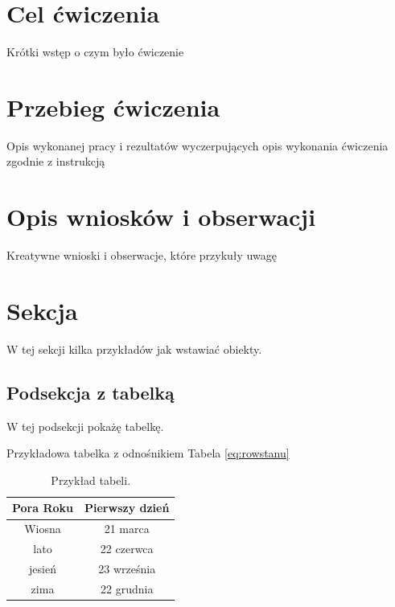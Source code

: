 \documentclass{sprawozdanie-agh}
\begin{document}

\stronatytulowa{}


\section{Cel ćwiczenia}
Krótki wstęp o czym było ćwiczenie
\section{Przebieg ćwiczenia}
Opis wykonanej pracy i rezultatów wyczerpujących opis wykonania ćwiczenia zgodnie z instrukcją
\section{Opis wniosków i obserwacji}
Kreatywne wnioski i obserwacje, które przykuły uwagę

\newpage

\section{Sekcja}
W tej sekcji kilka przykładów jak wstawiać obiekty.
\subsection{Podsekcja z tabelką}

    W tej podsekcji pokażę tabelkę.
    
    Przykładowa tabelka z odnośnikiem Tabela \ref{eq:rowstanu}
    
    \begin{table}[h!]
        \centering
        \caption{Przykład tabeli.}\label{tab1}
        \begin{tabular}{|c|c|}
            \hline
            Pora Roku &  Pierwszy dzień\\
            \hline
            Wiosna &  21 marca \\
            lato &  22 czerwca\\
            jesień & 23 września \\
            zima & 22 grudnia\\
            \hline
        \end{tabular}
    \end{table}
\end{document}
